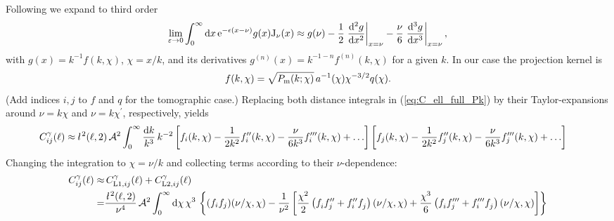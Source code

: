 \documentclass[useAMS,usenatbib]{mn2e} %
\newcommand{\ellbar}{\hbox{\it \l}\,}
\newcommand{\pref}{{\cal A}}
\begin{document}
Following \cite{2008PhRvD..78l3506L} we expand to third order
%
\begin{equation}
  \lim_{\varepsilon \rightarrow 0} \int_0^\infty {\rm d} x \, {\rm e}^{-\epsilon (x - \nu)} g(x) {\rm J}_\nu(x)
  \approx g(\nu) - \frac 1 2 \left.\frac{{\rm d}^2 g}{{\rm d} x^2}\right|_{x=\nu}
                 - \frac \nu 6 \left.\frac{{\rm d}^3 g}{{\rm d} x^3}\right|_{x=\nu} ,
\end{equation}
%
with $g(x) = k^{-1} f(k, \chi)$, $\chi=x/k$, and its derivatives $g^{(n)}(x) =
k^{-1-n} f^{(n)}(k, \chi)$ for a given $k$. In our case the projection kernel is
%
\begin{equation}
  f(k, \chi) = \sqrt{P_{\rm m}(k; \chi)} \, a^{-1}(\chi) \chi^{-3/2} q(\chi).
  \label{eq:f_LA08}
\end{equation}
%
(Add indices $i, j$ to $f$ and $q$ for the tomographic case.)
%
Replacing both distance integrals in (\ref{eq:C_ell_full_Pk}) by their Taylor-expansions around $\nu = k \chi$ and $\nu = k \chi^\prime$,
respectively, yields
%
\begin{align}
  C^\gamma_{ij}(\ell) \approx & \, \ellbar^2(\ell, 2) \, \pref^2
    \int_0^\infty \frac{{\rm d} k}{k^3} \, k^{-2}
    \left[ f_i(k, \chi) - \frac{1}{2 k^2} f_i^{\prime\prime}(k, \chi)
      - \frac{\nu}{6 k^3} f_i^{\prime\prime\prime}(k, \chi) + \ldots \right]
    \left[ f_j(k, \chi) - \frac{1}{2 k^2} f_j^{\prime\prime}(k, \chi)
    - \frac{\nu}{6 k^3} f_j^{\prime\prime\prime}(k, \chi) + \ldots \right]
  \label{eq:C_ell_limber2_dk}
\end{align}
%
Changing the integration to $\chi = \nu/k$ and collecting terms according to their $\nu$-dependence:
%
\begin{align}
  C^\gamma_{ij}(\ell) \approx & \, C^\gamma_{{\rm L1}, ij}(\ell) + C^\gamma_{{\rm L2}, ij}(\ell)
      \nonumber \\
    = & \frac{\ellbar^2(\ell, 2)}{\nu^4} \, \pref^2
    \int_0^\infty {\rm d} \chi \, \chi^3 \, %
    \left\{
    (f_i f_j)(\nu/\chi, \chi)
     - \frac 1 {\nu^2} \left[ \frac{\chi^2}{2} \left( f^{}_i f^{\prime\prime}_j + f_i^{\prime\prime} f^{}_j \right)(\nu/\chi, \chi)
    + \frac{\chi^3}{6} \left( f^{}_i f^{\prime\prime\prime}_j + f^{\prime\prime\prime}_i f^{}_j \right)(\nu/\chi, \chi)
    \right]
    \right\}
  \label{eq:C_ell_limber12_dr}
\end{align}
\end{document}
